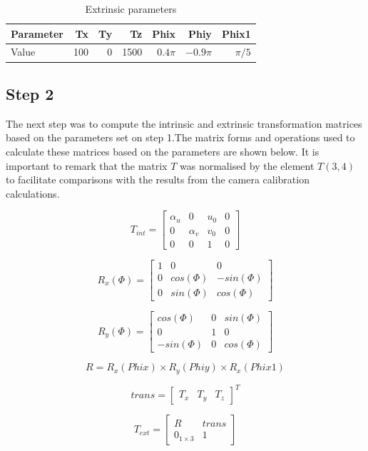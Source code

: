 \documentclass[journal]{IEEEtran}
\begin{document}
\begin{table}[H]
	\caption{Extrinsic parameters}
	\centering
	\begin{tabular}{l | r r r r r r}\label{extrinsics}
		Parameter & Tx & Ty & Tz & Phix & Phiy & Phix1\\
		\hline
		Value & 100 & 0 & 1500 & $0.4\pi$ & $-0.9\pi$ & $\pi /5$\\
	\end{tabular}
\end{table}

\subsection{Step 2}

The next step was to compute the intrinsic and extrinsic transformation matrices based on the parameters set on step 1.The matrix forms and operations used to calculate these matrices based on the parameters are shown below. It is important to remark that the matrix $T$ was normalised by the element $T(3,4)$ to facilitate comparisons with the results from the camera calibration calculations.

\[
T_{int} = 
\begin{bmatrix}
    \alpha_u & 0 & u_0 & 0 \\
    0 & \alpha_v & v_0 & 0 \\
    0 & 0 & 1 & 0
\end{bmatrix}
\]

\[
R_x(\Phi) = 
\begin{bmatrix}
    1 & 0 & 0 \\
    0 & cos(\Phi) & -sin(\Phi) \\
    0 & sin(\Phi) & cos(\Phi)
\end{bmatrix}
\]

\[
R_y(\Phi) = 
\begin{bmatrix}
    cos(\Phi) & 0 & sin(\Phi) \\
    0 & 1 & 0 \\
    -sin(\Phi) & 0 & cos(\Phi)
\end{bmatrix}
\]

\[
R = R_x(Phix) \times R_y(Phiy) \times R_x(Phix1)
\]

\[
trans = 
\begin{bmatrix}
    T_x & T_y & T_z 
\end{bmatrix}^T
\]

\[
T_{ext} = 
\begin{bmatrix}
    R & trans \\
    0_{1 \times 3} & 1
\end{bmatrix}
\]
\end{document}
